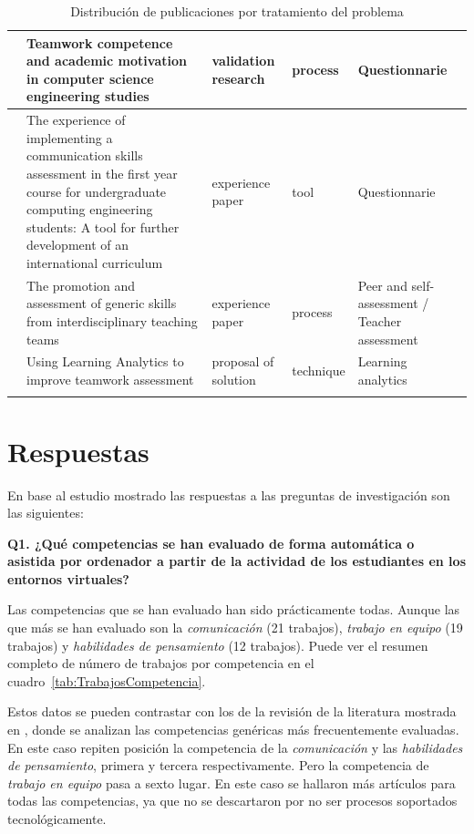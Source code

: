 \begin{landscape}
\begin{center}
\begin{longtable}{| m{2.5cm} | m{9cm} | m{4cm} | m{2.5cm} | m{3.5cm} |}
    \hline
    \cite{martinez2014teamwork} & Teamwork competence and academic motivation in computer science engineering studies & validation research & process & Questionnarie \\
    \hline
    \cite{fernandez2011experience} & The experience of implementing a communication skills assessment in the first year course for undergraduate computing engineering students: A tool for further development of an international curriculum & experience paper & tool & Questionnarie \\
    \hline
    \cite{carreras2013promotion} & The promotion and assessment of generic skills from interdisciplinary teaching teams & experience paper & process & Peer and self-assessment / Teacher assessment \\
    \hline
    \cite{fidalgo:2015} & Using Learning Analytics to improve teamwork assessment & proposal of solution & technique & Learning analytics \\
    \hline
\caption{Distribución de publicaciones por tratamiento del problema}
\label{tab:ListadoTrabajos}
\end{longtable}
\end{center}
\end{landscape}

\pagestyle{fancy}
\section{Respuestas}

En base al estudio mostrado las respuestas a las preguntas de investigación son las siguientes:

\bigskip
\textbf{Q1. ¿Qué competencias se han evaluado de forma automática o asistida por ordenador a partir de la actividad de los estudiantes en los entornos virtuales?}

Las competencias que se han evaluado han sido prácticamente todas. Aunque las que más se han evaluado son la \emph{comunicación} (21 trabajos), \emph{trabajo en equipo} (19 trabajos) y \emph{habilidades de pensamiento} (12 trabajos). Puede ver el resumen completo de número de trabajos por competencia en el cuadro~\ref{tab:TrabajosCompetencia}.

Estos datos se pueden contrastar con los de la revisión de la literatura mostrada en \cite{strijbos2015criteria}, donde se analizan las competencias genéricas más frecuentemente evaluadas. En este caso repiten posición la competencia de la \emph{comunicación} y las \emph{habilidades de pensamiento}, primera y tercera respectivamente. Pero la competencia de \emph{trabajo en equipo} pasa a sexto lugar. En este caso se hallaron más artículos para todas las competencias, ya que no se descartaron por no ser procesos soportados tecnológicamente. 

